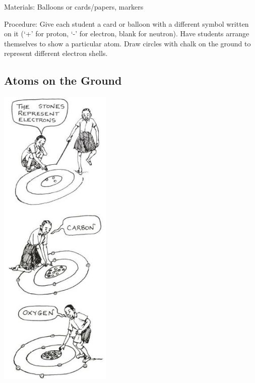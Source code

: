 \begin{multicols}{2}
\begin{description*}
\item[Materials:]{Balloons or cards/papers, markers}
\item[Procedure:]{Give each student a card or balloon with a different symbol written on it (`+' for proton, `-' for electron, blank for neutron). Have students arrange themselves to show a particular atom. Draw circles with chalk on the ground to represent different electron shells.}
\end{description*}

\subsection{Atoms on the Ground}

\begin{center}
\includegraphics[width=0.4\textwidth]{./img/source/stone-atoms.jpg}
\end{center}


\end{multicols}
